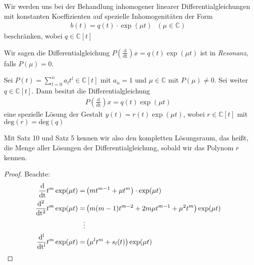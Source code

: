 	Wir werden uns bei der Behandlung inhomogener linearer Differentialgleichungen 
	mit konstanten Koeffizienten auf spezielle Inhomogenitäten der Form
	\begin{align*}
		b(t) = q(t) \cdot \exp(\mu t) \text{ } (\mu \in \mathbb{C})
	\end{align*}
	beschränken, wobei $q \in \mathbb{C} [t]$
\begin{Definition}{
	Wir sagen die Differentialgleichung $P\left( \frac{\mathrm{d}}
	{\mathrm{dt}}\right)x = q(t) \exp(\mu t)$ ist in \emph{Resonanz}, falls 
	$P(\mu) = 0$.
}\end{Definition}

\begin{Satz}{
	Sei $P(t) = \sum_{l=0}^n a_l t^l \in \mathbb{C}[t]$ mit 
	$a_n = 1$ und $\mu \in \mathbb{C}$ mit $P(\mu) \neq 0$. Sei weiter 
	$q \in \mathbb{C}[t]$. Dann besitzt die Differentialgleichung 
	\begin{align*}
		P\left(\frac{\mathrm{d}}{\mathrm{dt}}\right) x = q(t) \exp(\mu t)
	\end{align*}
	eine spezielle Lösung der Gestalt $y(t) = r(t) \exp(\mu t)$, wobei 
	$r \in \mathbb{C}[t]$ mit \\ $\mathrm{deg} (r) = \mathrm{deg}(q)$
}\end{Satz}

\begin{Bemerkung}{
	Mit Satz 10  und Satz 5  kennen wir also den kompletten 
	Lösungsraum, das heißt, die Menge aller Lösungen der Differentialgleichung,
	sobald wir das Polynom $r$ kennen.
}\end{Bemerkung}
\begin{proof}
	Beachte: 
	\begin{align}
		\frac{\mathrm{d}}{\mathrm{dt}} t^m \exp ( \mu t) = 
			& \left( m t^{m-1} + \mu t^m \right) \cdot \exp(\mu t) \notag \\
		 \frac{\mathrm{d^2}}{\mathrm{dt^2}} 
		 t^m \exp ( \mu t) = & \left( m (m-1) t^{m-2} + 
			 2m \mu t^{m-1} + {\mu}^2 t^m \right) \exp(\mu t) \notag \\
		 \vdots \notag
		 \\
		 \frac{\mathrm{d^l}}{\mathrm{dt^l}} t^m \exp(\mu t) 
		 	= & \left( {\mu}^l t^m + s_l(t) \right)\exp(\mu t)  \label{vl_17_gl_1}
	\end{align}
\end{proof}

